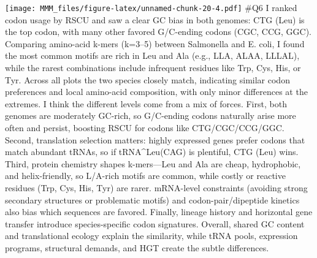 \documentclass[
]{article}
\begin{document}
\texttt{[image: MMM\_files/figure-latex/unnamed-chunk-20-4.pdf]} \#Q6 I
ranked codon usage by RSCU and saw a clear GC bias in both genomes: CTG
(Leu) is the top codon, with many other favored G/C-ending codons (CGC,
CCG, GGC). Comparing amino-acid k-mers (k=3--5) between Salmonella and
E. coli, I found the most common motifs are rich in Leu and Ala (e.g.,
LLA, ALAA, LLLAL), while the rarest combinations include infrequent
residues like Trp, Cys, His, or Tyr. Across all plots the two species
closely match, indicating similar codon preferences and local amino-acid
composition, with only minor differences at the extremes. I think the
different levels come from a mix of forces. First, both genomes are
moderately GC-rich, so G/C-ending codons naturally arise more often and
persist, boosting RSCU for codons like CTG/CGC/CCG/GGC. Second,
translation selection matters: highly expressed genes prefer codons that
match abundant tRNAs, so if tRNA\^{}Leu(CAG) is plentiful, CTG (Leu)
wins. Third, protein chemistry shapes k-mers---Leu and Ala are cheap,
hydrophobic, and helix-friendly, so L/A-rich motifs are common, while
costly or reactive residues (Trp, Cys, His, Tyr) are rarer. mRNA-level
constraints (avoiding strong secondary structures or problematic motifs)
and codon-pair/dipeptide kinetics also bias which sequences are favored.
Finally, lineage history and horizontal gene transfer introduce
species-specific codon signatures. Overall, shared GC content and
translational ecology explain the similarity, while tRNA pools,
expression programs, structural demands, and HGT create the subtle
differences.
\end{document}
